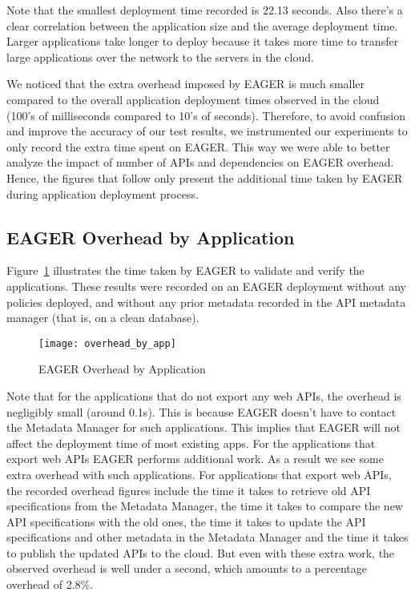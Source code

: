Note that the smallest deployment time recorded is 22.13 seconds. Also there's a clear correlation between the
application size and the average deployment time. Larger applications take longer to deploy because it takes more time
to transfer large applications over the network to the servers in the cloud.

We noticed that the extra overhead imposed by EAGER is much smaller compared to the overall application
deployment times observed in the cloud (100's of milliseconds compared to 10's of seconds). 
Therefore, to avoid confusion and improve the accuracy of our test results, we instrumented our experiments to
only record the extra time spent on EAGER. This way we were able to better analyze the impact of number of APIs and dependencies
on EAGER overhead. Hence, the figures that follow only present the additional time taken by EAGER during application
deployment process.

\subsection{EAGER Overhead by Application}

Figure~\ref{fig:overhead_by_app} illustrates the time taken by EAGER to validate and verify the applications.
These results were recorded on an EAGER deployment without any policies deployed, and without any prior
metadata recorded in the API metadata manager (that is, on a clean database).

\begin{figure}
\centering
\texttt{[image: overhead\_by\_app]}
\caption{EAGER Overhead by Application}
\label{fig:overhead_by_app}
\end{figure}

Note that for the applications that do not export any web APIs, the overhead is negligibly small (around 0.1s). This is because EAGER
doesn't have to contact the Metadata Manager for such applications. This implies that EAGER will not affect 
the deployment time of most existing apps. For the applications that 
export web APIs EAGER performs additional work. As a result we see some extra overhead with such applications. 
For applications that export web APIs, the recorded overhead figures include the time it takes to retrieve old API specifications from the
Metadata Manager, the time it takes to compare the new API specifications with the old ones, the time it takes to update the API specifications
and other metadata in the Metadata Manager and the time it takes to publish the updated APIs to the cloud.
But even with these extra work, the observed overhead is well under a second,
which amounts to a percentage overhead of 2.8\%.

